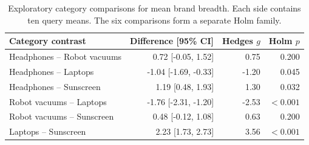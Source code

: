 \begin{table}[H]
\caption{Exploratory category comparisons for mean brand breadth. Each side contains ten query means. The six comparisons form a separate Holm family.}\label{tab:categories}
\small
\begin{tabularx}{\textwidth}{Y r r r}
\toprule
Category contrast & Difference [95\% CI] & Hedges $g$ & Holm $p$ \\
\midrule
Headphones -- Robot vacuums & 0.72 [-0.05, 1.52] & 0.75 & 0.200 \\
Headphones -- Laptops & -1.04 [-1.69, -0.33] & -1.20 & 0.045 \\
Headphones -- Sunscreen & 1.19 [0.48, 1.93] & 1.30 & 0.032 \\
Robot vacuums -- Laptops & -1.76 [-2.31, -1.20] & -2.53 & $<0.001$ \\
Robot vacuums -- Sunscreen & 0.48 [-0.12, 1.08] & 0.63 & 0.200 \\
Laptops -- Sunscreen & 2.23 [1.73, 2.73] & 3.56 & $<0.001$ \\
\bottomrule
\end{tabularx}
\end{table}
